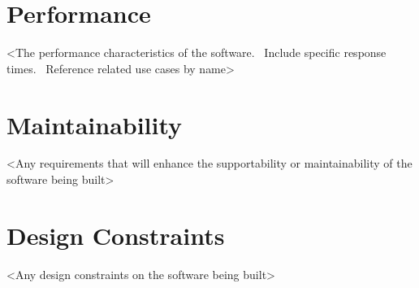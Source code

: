 \documentclass[letterpaper]{report}
\begin{document}
\section{Performance}
 {\textless}The performance characteristics of the software. \ Include specific response times. \ Reference related use cases by name{\textgreater}

\section{Maintainability}
 {\textless}Any requirements that will enhance the supportability or maintainability of the software being built{\textgreater}

\section{Design Constraints}
 {\textless}Any design constraints on the software being built{\textgreater}
\end{document}

